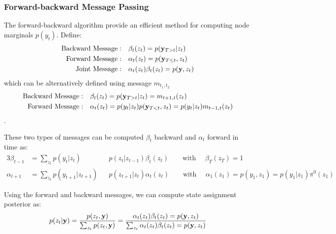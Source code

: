\documentclass{article} %
\begin{document}
\subsubsection{Forward-backward Message Passing} \label{sec:FBMP}
The forward-backward algorithm provide an efficient method for computing node marginals $p(y_t)$. Define:
\begin{align*}
\mbox{Backward Message}: \quad &
\beta_t(z_t) = p({\bf y}_{T>t} | z_t)
\\
\mbox{Forward Message}: \quad &
\alpha_t(z_t) = p({\bf y}_{T \leq t}, z_t)
\\
\mbox{Joint Message}: \quad &
\alpha_t(z_t)\beta_t(z_t) = p({\bf y}, z_t)
\end{align*}
which can be alternatively defined using message $m_{t_1, t_2}$
\begin{align*}
\mbox{Backward Message}: \quad &
\beta_t(z_t) = p({\bf y}_{T>t}|z_t) = m_{t+1, t}(z_t)
\\
\mbox{Forward Message}: \quad &
\alpha_t(z_t) = p(y_t | z_t ) p({\bf y}_{T<t}, z_t) =
p(y_t | z_t ) m_{t-1, t}(z_t)
\end{align*}.

These two types of messages can be computed $\beta_t$ backward and $\alpha_t$ forward in time as:
\begin{alignat*}{3}
\beta_{t-1} &= \sum_{z_t}
p(y_{t} | z_t ) && p(z_t | z_{t-1})  \beta_{t}(z_t)
\qquad \mbox{with } \quad
\beta_T(z_T) = 1
\\
\alpha_{t+1}  &=  \sum_{z_t}
p(y_{t+1} | z_{t+1} ) && p(z_{t+1} | z_{t})  \alpha_{t}(z_t)
\qquad \mbox{with } \quad
\alpha_1(z_1) = p(y_1, z_1) = p(y_1 | z_1) \pi^0(z_1)
\end{alignat*}

Using the forward and backward messages, we can compute state assignment posterior as:
\begin{align*}
p(z_t | {\bf y}) = \frac{p(z_t, {\bf y})}{\sum_{z_t} p(z_t, {\bf y})}
=
\frac{\alpha_t(z_t)\beta_t(z_t) = p({\bf y}, z_t)}
{\sum_{z_t} \alpha_t(z_t)\beta_t(z_t) = p({\bf y}, z_t)}
\end{align*}
\end{document}
